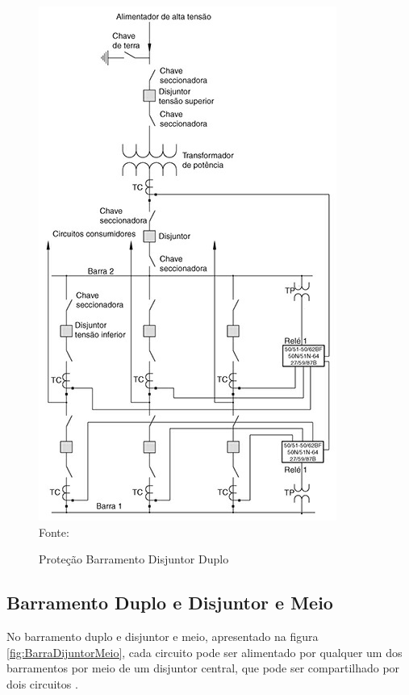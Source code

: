 \begin{figure}[!htb] 
    \centering
    \caption{Proteção Barramento Disjuntor Duplo}
    \includegraphics[scale = .8]{figuras/BarraDijuntorDuplo.png}
    \\ Fonte: \cite{mamede2000protecao}
    \label{fig:BarraDijuntorDuplo}
\end{figure}


\newpage

\subsection{Barramento Duplo e Disjuntor e Meio}

No barramento duplo e disjuntor e meio, apresentado na figura \ref{fig:BarraDijuntorMeio}, cada circuito pode ser alimentado por qualquer um dos barramentos por meio de um disjuntor central, que pode ser compartilhado por dois circuitos \cite{mamede2000protecao}.


